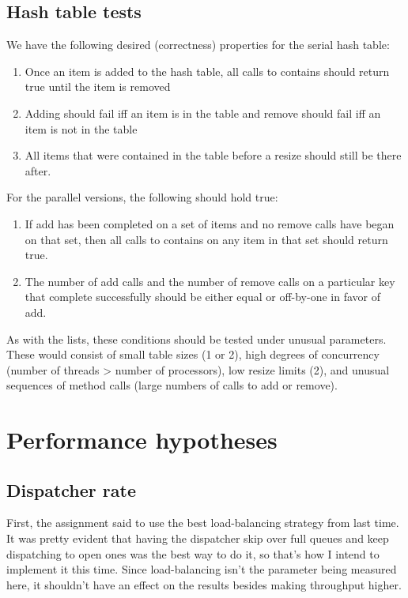 \documentclass{article}
\begin{document}
\subsection*{Hash table tests}
We have the following desired (correctness) properties for the serial hash table:
\begin{enumerate}
    \item Once an item is added to the hash table, all calls to contains should return true until the item is removed
    \item Adding should fail iff an item is in the table and remove should fail iff an item is not in the table
    \item All items that were contained in the table before a resize should still be there after.
\end{enumerate}

For the parallel versions, the following should hold true:
\begin{enumerate}
    \item If add has been completed on a set of items and no remove calls have began on that set, then all calls to contains on any item in that set should return true.
    \item The number of add calls and the number of remove calls on a particular key that complete successfully should be either equal or off-by-one in favor of add.
\end{enumerate}

As with the lists, these conditions should be tested under unusual parameters. These would consist of small table sizes (1 or 2), high degrees of concurrency (number of threads > number of processors), low resize limits (2), and unusual sequences of method calls (large numbers of calls to add or remove).
\section*{Performance hypotheses}
\subsection*{Dispatcher rate}
First, the assignment said to use the best load-balancing strategy from last time. It was pretty evident that having the dispatcher skip over full queues and keep dispatching to open ones was the best way to do it, so that's how I intend to implement it this time. Since load-balancing isn't the parameter being measured here, it shouldn't have an effect on the results besides making throughput higher.
\end{document}
